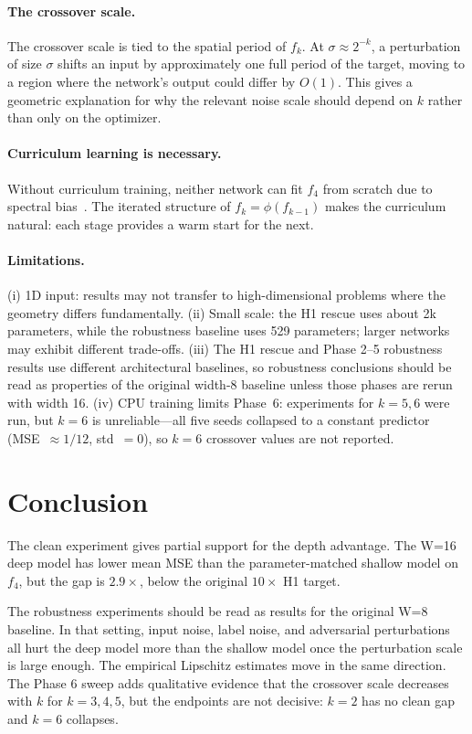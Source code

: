 \documentclass[10pt,twocolumn]{article}
\begin{document}
\paragraph{The crossover scale.}
The crossover scale is tied to the spatial period of $f_k$. At
$\sigma \approx 2^{-k}$, a perturbation of size $\sigma$ shifts an input by approximately
one full period of the target, moving to a region where the network's output could differ
by $O(1)$. This gives a geometric explanation for why the relevant noise scale should
depend on $k$ rather than only on the optimizer.

\paragraph{Curriculum learning is necessary.}
Without curriculum training, neither network can fit $f_4$ from scratch due to spectral
bias~\citep{rahaman2019spectral}. The iterated structure of $f_k = \phi(f_{k-1})$ makes
the curriculum natural: each stage provides a warm start for the next.

\paragraph{Limitations.}
(i) 1D input: results may not transfer to high-dimensional problems where the geometry
differs fundamentally. (ii) Small scale: the H1 rescue uses about 2k parameters, while
the robustness baseline uses 529 parameters; larger networks may exhibit different
trade-offs. (iii) The H1 rescue and Phase 2--5 robustness results use different
architectural baselines, so robustness conclusions should be read as properties of the
original width-8 baseline unless those phases are rerun with width 16. (iv) CPU training
limits Phase~6: experiments for $k=5,6$ were run, but $k=6$ is unreliable---all five
seeds collapsed to a constant predictor (MSE~$\approx 1/12$, std~$=0$), so $k=6$
crossover values are not reported.


\section{Conclusion}
\label{sec:conclusion}

The clean experiment gives partial support for the depth advantage. The W=16 deep
model has lower mean MSE than the parameter-matched shallow model on $f_4$, but the
gap is $2.9\times$, below the original $10\times$ H1 target.

The robustness experiments should be read as results for the original W=8 baseline.
In that setting, input noise, label noise, and adversarial perturbations all hurt the
deep model more than the shallow model once the perturbation scale is large enough.
The empirical Lipschitz estimates move in the same direction. The Phase 6 sweep adds
qualitative evidence that the crossover scale decreases with $k$ for $k=3,4,5$, but
the endpoints are not decisive: $k=2$ has no clean gap and $k=6$ collapses.


\end{document}

